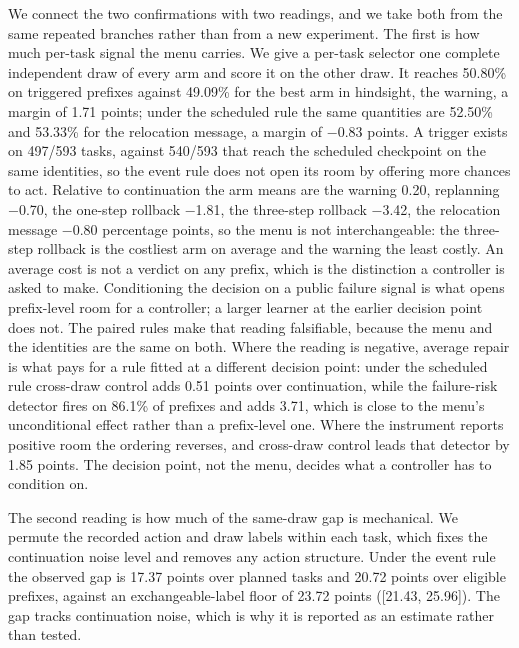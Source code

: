 We connect the two confirmations with two readings, and we take both from the same repeated branches rather than from a new experiment. The first is how much per-task signal the menu carries. We give a per-task selector one complete independent draw of every arm and score it on the other draw. It reaches 50.80\% on triggered prefixes against 49.09\% for the best arm in hindsight, the warning, a margin of 1.71 points; under the scheduled rule the same quantities are 52.50\% and 53.33\% for the relocation message, a margin of $-$0.83 points. A trigger exists on 497/593 tasks, against 540/593 that reach the scheduled checkpoint on the same identities, so the event rule does not open its room by offering more chances to act. Relative to continuation the arm means are the warning 0.20, replanning $-$0.70, the one-step rollback $-$1.81, the three-step rollback $-$3.42, the relocation message $-$0.80 percentage points, so the menu is not interchangeable: the three-step rollback is the costliest arm on average and the warning the least costly. An average cost is not a verdict on any prefix, which is the distinction a controller is asked to make. Conditioning the decision on a public failure signal is what opens prefix-level room for a controller; a larger learner at the earlier decision point does not. The paired rules make that reading falsifiable, because the menu and the identities are the same on both. Where the reading is negative, average repair is what pays for a rule fitted at a different decision point: under the scheduled rule cross-draw control adds 0.51 points over continuation, while the failure-risk detector fires on 86.1\% of prefixes and adds 3.71, which is close to the menu's unconditional effect rather than a prefix-level one. Where the instrument reports positive room the ordering reverses, and cross-draw control leads that detector by 1.85 points. The decision point, not the menu, decides what a controller has to condition on.

The second reading is how much of the same-draw gap is mechanical. We permute the recorded action and draw labels within each task, which fixes the continuation noise level and removes any action structure. Under the event rule the observed gap is 17.37 points over planned tasks and 20.72 points over eligible prefixes, against an exchangeable-label floor of 23.72 points ([21.43, 25.96]). The gap tracks continuation noise, which is why it is reported as an estimate rather than tested.

